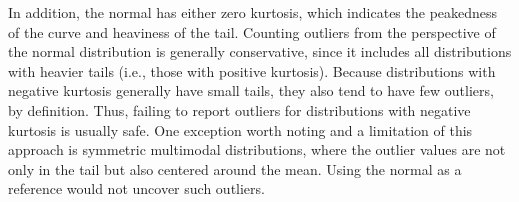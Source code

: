 In addition, the normal has either zero kurtosis, which indicates the
peakedness of the curve and heaviness of the tail. Counting outliers
from the perspective of the normal distribution is generally
conservative, since it includes all distributions with heavier tails
(i.e., those with positive kurtosis). Because distributions with negative
kurtosis generally have small tails, they also tend to have few
outliers, by definition. Thus, failing to report outliers for
distributions with negative kurtosis is usually safe.
One exception worth noting and a limitation of this approach is
symmetric multimodal distributions, where the outlier values are not only
in the tail but also centered around the mean. Using the normal as a
reference would not uncover such outliers.

